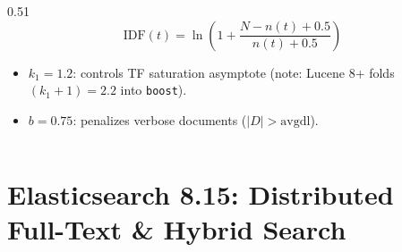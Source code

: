 \documentclass[aspectratio=169]{beamer}
\begin{document}
\begin{frame}
\begin{columns}[T]
\begin{column}{0.51\textwidth}
{\[\]
\[
\text{IDF}(t) = \ln\!\left(1 + \frac{N - n(t) + 0.5}{n(t) + 0.5}\right)
\]
}
\scriptsize
\begin{itemize}
    \item $k_1 = 1.2$: controls TF saturation asymptote (note: Lucene 8+ folds $(k_1+1)=2.2$ into \texttt{boost}).
    \item $b = 0.75$: penalizes verbose documents ($|D| > \text{avgdl}$).
\end{itemize}
\end{column}
\end{columns}
\end{frame}

\section{Elasticsearch 8.15: Distributed Full-Text \& Hybrid Search}
\end{document}

